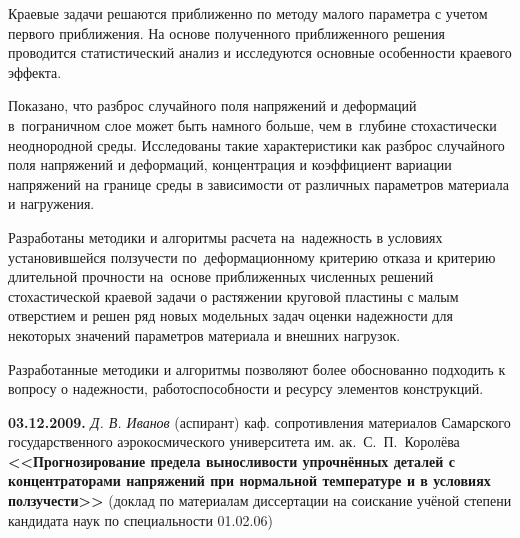 {Краевые задачи решаются приближенно по методу малого параметра с учетом первого приближения.
На основе полученного приближенного решения проводится статистический анализ 
и исследуются основные особенности краевого эффекта. 

Показано, что разброс случайного поля напряжений и деформаций
в~пограничном слое может быть намного больше, чем в~глубине
стохастически неоднородной среды. Исследованы такие характеристики как разброс случайного поля напряжений и деформаций, концентрация и коэффициент вариации напряжений на границе среды в зависимости от различных параметров материала и нагружения.

Разработаны методики и алгоритмы расчета на~надежность в условиях
установившейся ползучести по~деформационному критерию отказа и
критерию длительной прочности на~основе приближенных численных
решений стохастической краевой задачи о растяжении круговой пластины
с малым отверстием и решен ряд новых модельных задач оценки
надежности для некоторых значений параметров материала и внешних
нагрузок.

Разработанные методики и алгоритмы позволяют более обоснованно подходить к вопросу о надежности, работоспособности и ресурсу элементов конструкций.
}



\bigskip

\noindent
{\bf 03.12.2009.} {\it Д. В. Иванов} {\footnotesize (аспирант) каф. сопротивления материалов Самарского государственного аэрокосмического университета им. ак.~С.~П.~Королёва} \\
{\bf <<Прогнозирование предела выносливости упрочнённых деталей с концентраторами напряжений при нормальной температуре и в условиях ползучести>> } {\footnotesize (доклад по материалам диссертации на соискание учёной степени кандидата наук по специальности 01.02.06)}

\smallskip

